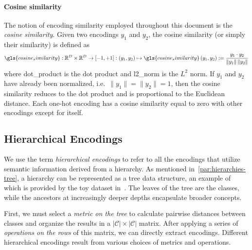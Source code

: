 \paragraph{Cosine similarity} The notion of encoding similarity employed throughout this document is the \emph{cosine similarity}. Given two encodings $y_1$ and $y_2$, the cosine similarity (or simply their similarity) is defined as
\begin{equation}
  \gls{cosine_similarity}: \mathbb{R}^{D} \times \mathbb{R}^{D} \to \left[-1, +1\right]
  : (y_1, y_2) \mapsto \gls{cosine_similarity} \,(y_1, y_2) :=
  \frac{y_1 \cdot y_2}{\|y_1\| \, \|y_2\|}
  \label{eq:cosine-similarity}
\end{equation}
where \gls{dot_product} is the dot product and \gls{l2_norm} is the $L^2$ norm.
If $y_1$ and $y_2$ have already been normalized, i.e.\ $\|y_1\| = \|y_2\| = 1$, then the cosine similarity reduces to the dot product and is proportional to the Euclidean distance. Each one-hot encoding has a cosine similarity equal to zero with other encodings except for itself.


\subsection{Hierarchical Encodings}
\label{subsec:hierarchical-encodings}

We use the term \emph{hierarchical encodings} to refer to all the encodings that utilize semantic information derived from a hierarchy. As mentioned in~\cref{par:hierarchies-tree}, a hierarchy can be represented as a tree data structure, an example of which is provided by the toy dataset in~. The leaves of the tree are the classes, while the ancestors at increasingly deeper depths encapsulate broader concepts.

First, we must select a \emph{metric on the tree} to calculate pairwise distances between classes and organize the results in a $|\mathcal{C}| \times |\mathcal{C}|$ matrix. After applying a series of \emph{operations on the rows} of this matrix, we can directly extract encodings. Different hierarchical encodings result from various choices of metrics and operations.

